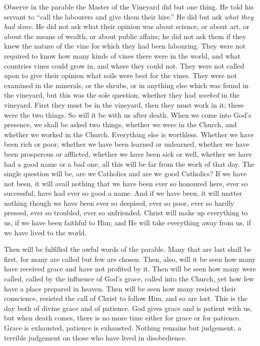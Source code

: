Observe in the parable the Master of the Vineyard
did but one thing. He told his servant to ``call the labourers and
give them their hire.'' He did but ask \emph{what they had done}. He
did not ask what their opinion was about science, or about art, or
about the means of wealth, or about public affairs; he did not ask
them if they knew the nature of the vine for which they had been
labouring. They were not required to know how many kinds of vines
there were in the world, and what countries vines could grow in, and
where they could not. They were not called upon to give their opinion
what soils were best for the vines. They were not examined in the
minerals, or the shrubs, or in anything else which was found in the
vineyard, but this was the sole question, whether they had \emph{worked}
in the vineyard. First they must be in the vineyard, then they must
work in it; these were the two things. So will it be with us after
death. When we come into God's presence, we shall be asked two
things, whether we were in the Church, and whether we worked in the
Church. Everything else is worthless. Whether we have been rich or
poor, whether we have been learned or unlearned, whether we have been
prosperous or afflicted, whether we have been sick or well, whether we
have had a good name or a bad one, all this will be far from the work
of that day. The single question will be, are we Catholics and are we
good Catholics? If we have not been, it will avail nothing that we
have been ever so honoured here, ever so successful, have had ever so
good a name. And if we have been, it will matter nothing though we
have been ever so despised, ever so poor, ever so hardly pressed, ever
so troubled, ever so unfriended. Christ will make up everything to us,
if we have been faithful to Him; and He will take everything away from
us, if we have lived to the world.

Then will be fulfilled the awful words of the
parable. Many that are last shall be first, for many are called but
few are chosen. Then, also, will it be seen how many have received
grace and have not profited by it. Then will be seen how many were
called, called by the influence of God's grace, called into the
Church, yet how few have a place prepared in heaven. Then will be seen
how many resisted their conscience, resisted the call of Christ to
follow Him, and so are lost. This is the day both of divine grace and
of patience. God gives grace and is patient with us, but when
death comes, there is no more time either for grace or for patience.
Grace is exhausted, patience is exhausted. Nothing remains but
judgement, a terrible judgement on those who have lived in
disobedience.

